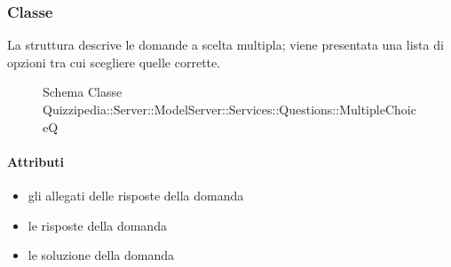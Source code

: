\subsubsection{Classe }
La struttura descrive le domande a scelta multipla; viene presentata una lista di opzioni tra cui scegliere quelle corrette.
\begin{figure}[H]
\centering
\noindent{}
\caption[Schema Classe MultipleChoiceQ]{Schema Classe Quizzipedia::Server::ModelServer::Services::Questions::MultipleChoiceQ}
\end{figure}
\paragraph{Attributi}
\begin{itemize}
\item {}
\newline
gli allegati delle risposte della domanda
\item {}
\newline
le risposte della domanda
\item {}
\newline
le soluzione della domanda
\end{itemize}
